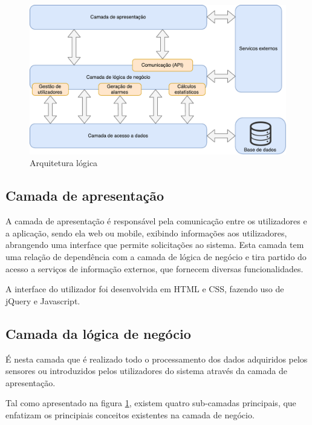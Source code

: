 \begin{figure}[!htb]
	\centering
	\includegraphics[scale = 0.6]{esquemas/arquitetura-logica.pdf}
	\caption{Arquitetura lógica}
	\label{logicaarqu}
\end{figure}



\subsection{Camada de apresentação}


A camada de apresentação é responsável pela comunicação entre os utilizadores e a aplicação, sendo ela web ou mobile, exibindo informações aos utilizadores, abrangendo uma interface que permite solicitações ao sistema. Esta camada tem uma relação de dependência com a camada de lógica de negócio e tira partido do acesso a serviços de informação externos, que fornecem diversas funcionalidades. 


A interface do utilizador foi desenvolvida em  \ac{HTML} e \acs{CSS}, fazendo uso de jQuery e Javascript.











\subsection{Camada da lógica de negócio}

É nesta camada que é realizado todo o processamento dos dados adquiridos pelos sensores ou introduzidos pelos utilizadores do sistema através da camada de apresentação. 


Tal como apresentado na figura \ref{logicaarqu}, existem quatro sub-camadas principais, que enfatizam os principiais conceitos existentes na camada de negócio. 


